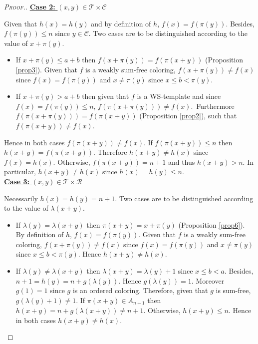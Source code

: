 \begin{proof}[\textsc{Proof.}]
\noindent \underline{\textbf{Case 2:} \((x,y) \in \mathcal{T} \times \mathcal{C}\)}
\par
Given that \(h(x) = h(y)\) and by definition of \(h\), \(f(x) = f(\pi(y))\). Besides, \(f(\pi(y)) \leqslant n\) since
\(y \in \mathcal{C}\). Two cases are to be distinguished according to the value of \(x + \pi(y)\).
\begin{itemize}
\item \begin{sloppypar}
	If \(x + \pi(y) \leqslant a + b\) then \(f(x + \pi(y)) = f(\pi(x + y))\) (Proposition \ref{prop3}). Given that \(f\) is
	a weakly sum-free coloring, \(f(x+\pi(y)) \neq f(x)\) since \(f(x)=f(\pi(y))\) and \(x \neq \pi(y)\) since
	\({x \leqslant b < \pi(y)}\).
	\end{sloppypar}
\item \begin{sloppypar}
	If \(x+\pi(y)> a+b\) then given that \(f\) is a WS-template and since \({f(x) = f(\pi(y)) \leqslant n}\),
	\({f(\pi(x+\pi(y))) \neq f(x)}\).~Furthermore \({f(\pi(x+\pi(y))) = f(\pi(x+y))}\) (Proposition \ref{prop2}), such that
	\({f(\pi(x+ y)) \neq f(x)}\).
	\end{sloppypar}
\end{itemize}
\par
Hence in both cases \(f(\pi(x+y)) \neq f(x)\). If  \(f(\pi(x+y)) \leqslant n\) then \(h(x+y) = f(\pi(x+y))\). Therefore
\(h(x+y) \neq h(x)\) since \(f(x) = h(x)\). Otherwise, \(f(\pi(x+y)) = n + 1\) and thus \(h(x+y) > n\). In particular,
\(h(x + y) \neq h(x)\) since \(h(x) = h(y) \leqslant n\). \\

\noindent \underline{\textbf{Case 3:} \((x,y) \in \mathcal{T} \times \mathcal{R}\)}
\par
Necessarily \(h(x) = h(y) = n + 1\). Two cases are to be distinguished according to the value of \(\lambda(x+y)\).
\begin{itemize}
\item If \(\lambda(y)=\lambda(x+y)\) then \(\pi(x + y) = x + \pi(y)\) (Proposition \ref{prop6}). By definition of
	\(h\), \(f(x) = f(\pi(y))\). Given that \(f\) is a weakly sum-free coloring, \(f(x + \pi(y)) \neq f(x)\) since
	\(f(x) = f(\pi(y))\) and \(x \neq \pi(y)\) since \({x \leqslant b < \pi(y)}\). Hence \(h(x + y) \neq h(x)\).
\item If \(\lambda(y) \neq \lambda(x + y)\) then \(\lambda(x + y) = \lambda(y) + 1\) since \(x \leqslant b < a\).
	Besides, \(n + 1 = h(y) = n +  g(\lambda(y))\). Hence \(g(\lambda(y)) = 1\). Moreover \(g(1) = 1\) since \(g\)
	is an ordered coloring. Therefore, given that \(g\) is sum-free, \(g(\lambda(y) + 1) \neq 1\). If \(\pi(x + y) \in
	A_{n + 1}\) then \(h(x + y) = n + g(\lambda(x + y)) \neq n + 1\). Otherwise, \(h(x + y) \leqslant n\). Hence
	in both cases \(h(x + y) \neq h(x)\).
\end{itemize}


\end{proof}
